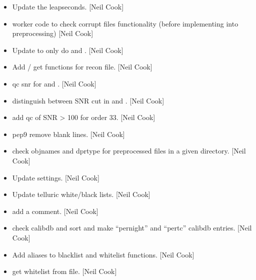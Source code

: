 \documentclass[a4paper,10pt,english]{report}
\begin{document}
\label{\detokenize{misc/changelog:id211}}\begin{itemize}
\item {} 
Update the leapseconds. {[}Neil Cook{]}

\item {} 
 \sphinxhyphen{} worker code to check corrupt files
functionality (before implementing into preprocessing) {[}Neil Cook{]}

\item {} 
Update to only do  and . {[}Neil Cook{]}

\item {} 
Add  / get functions for recon file. {[}Neil Cook{]}

\item {} 
 \sphinxhyphen{} qc snr for  and . {[}Neil
Cook{]}

\item {} 
 \sphinxhyphen{} distinguish between SNR cut in  and
. {[}Neil Cook{]}

\item {} 
 \sphinxhyphen{} add qc of SNR \textgreater{} 100 for order 33. {[}Neil Cook{]}

\item {} 
 \sphinxhyphen{} pep9 remove blank lines. {[}Neil Cook{]}

\item {} 
 \sphinxhyphen{} check objnames and dprtype for preprocessed files
in a given directory. {[}Neil Cook{]}

\item {} 
Update  settings. {[}Neil Cook{]}

\item {} 
Update telluric white/black lists. {[}Neil Cook{]}

\item {} 
 \sphinxhyphen{} add a comment. {[}Neil Cook{]}

\item {} 
 \sphinxhyphen{} check calibdb and sort and make “pernight” and
“pertc” calibdb entries. {[}Neil Cook{]}

\item {} 
 \sphinxhyphen{} Add aliases to blacklist and whitelist
functions. {[}Neil Cook{]}

\item {} 
 \sphinxhyphen{} get whitelist from file. {[}Neil Cook{]}

\end{itemize}
\end{document}
